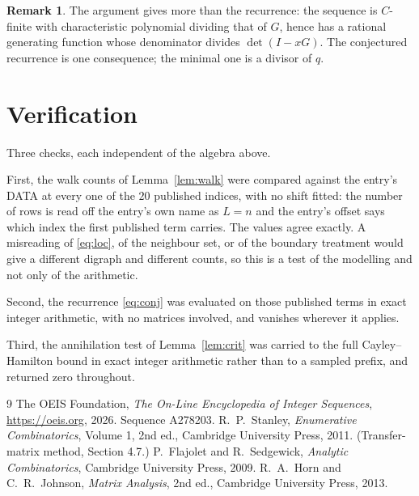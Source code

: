 \documentclass[11pt,a4paper]{article}
\theoremstyle{plain}
\theoremstyle{definition}
\newtheorem{remark}[theorem]{Remark}
\begin{document}
\begin{remark}
The argument gives more than the recurrence: the sequence is $C$-finite with characteristic
polynomial dividing that of $G$, hence has a rational generating function whose denominator
divides $\det(I-xG)$. The conjectured recurrence is one consequence; the minimal one is a
divisor of $q$.
\end{remark}

\section{Verification}

Three checks, each independent of the algebra above.

First, the walk counts of Lemma~\ref{lem:walk} were compared against the entry's DATA at
every one of the $20$ published indices, with no shift fitted: the number of rows is
read off the entry's own name as $L=n$ and the entry's offset says which index the first
published term carries. The values agree exactly. A misreading of \eqref{eq:loc}, of the
neighbour set, or of the boundary treatment would give a different digraph and different
counts, so this is a test of the modelling and not only of the arithmetic.

Second, the recurrence \eqref{eq:conj} was evaluated on those published terms in exact
integer arithmetic, with no matrices involved, and vanishes wherever it applies.

Third, the annihilation test of Lemma~\ref{lem:crit} was carried to the full
Cayley--Hamilton bound in exact integer arithmetic rather than to a sampled prefix, and
returned zero throughout.

\begin{thebibliography}{9}
 The OEIS Foundation, \emph{The On-Line Encyclopedia of Integer
Sequences}, \url{https://oeis.org}, 2026. Sequence A278203.
 R.~P.~Stanley, \emph{Enumerative Combinatorics}, Volume 1, 2nd ed.,
Cambridge University Press, 2011. (Transfer-matrix method, Section 4.7.)
 P.~Flajolet and R.~Sedgewick, \emph{Analytic Combinatorics}, Cambridge
University Press, 2009.
 R.~A.~Horn and C.~R.~Johnson, \emph{Matrix Analysis}, 2nd ed., Cambridge
University Press, 2013.
\end{thebibliography}
\end{document}
